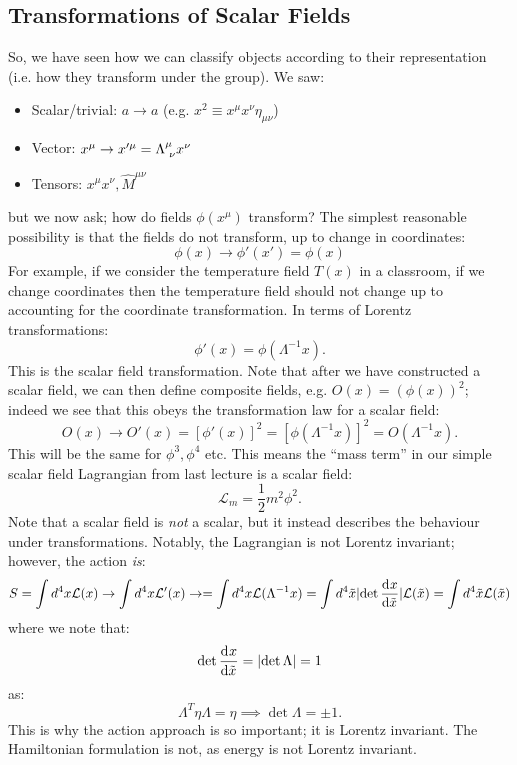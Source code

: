 \subsection{Transformations of Scalar Fields}
So, we have seen how we can classify objects according to their representation (i.e. how they transform under the group). We saw:
\begin{itemize}
    \item Scalar/trivial: $a \to a$ (e.g. $x^2 \equiv x^\mu x^\nu \eta_{\mu\nu}$)
    \item Vector: $x^\mu \to x'^\mu = \Lambda^\mu_{\sp\nu}x^\nu$
    \item Tensors: $x^\mu x^\nu, \hat{M}^{\mu\nu}$
\end{itemize}
but we now ask; how do fields $\phi(x^\mu)$ transform? The simplest reasonable possibility is that the fields do not transform, up to change in coordinates:
\begin{equation}
    \phi(x) \to \phi'(x') = \phi(x)
\end{equation}
For example, if we consider the temperature field $T(x)$ in a classroom, if we change coordinates then the temperature field should not change up to accounting for the coordinate transformation. In terms of Lorentz transformations:
\begin{equation}
    \boxed{\phi'(x) = \phi(\Lambda^{-1}x)}.
\end{equation}
This is the scalar field transformation. Note that after we have constructed a scalar field, we can then define composite fields, e.g. $O(x) = (\phi(x))^2$; indeed we see that this obeys the transformation law for a scalar field:
\begin{equation}
    O(x) \to O'(x) = \left[\phi'(x)\right]^2 = \left[\phi(\Lambda^{-1}x)\right]^2 = O(\Lambda^{-1}x).
\end{equation}
This will be the same for $\phi^3, \phi^4$ etc. This means the ``mass term'' in our simple scalar field Lagrangian from last lecture is a scalar field:
\begin{equation}
    \mathcal{L}_m =  \frac{1}{2}m^2\phi^2.
\end{equation}
Note that a scalar field is \emph{not} a scalar, but it instead describes the behaviour under transformations. Notably, the Lagrangian is not Lorentz invariant; however, the action \emph{is}:
\begin{equation}
    S = \int d^4x \mathcal{L}(x) \to \int d^4x \mathcal{L}'(x) \to  = \int d^4x\mathcal{L}(\Lambda^{-1}x) = \int d^4\tilde{x} \abs{\det\dod{x}{\tilde{x}}}\mathcal{L}(\tilde{x}) = \int d^4\tilde{x}\mathcal{L}(\tilde{x})
\end{equation}
where we note that:
\begin{equation}
    \det\dod{x}{\tilde{x}} = \abs{\det \Lambda} = 1
\end{equation}
as:
\begin{equation}
    \Lambda^T \eta \Lambda = \eta \implies \det \Lambda = \pm 1.
\end{equation}
This is why the action approach is so important; it is Lorentz invariant. The Hamiltonian formulation is not, as energy is not Lorentz invariant.
